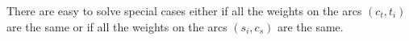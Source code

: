 \documentclass[10pt, conference, letterpaper]{IEEEtran}
\newcommand\pall{\textsc{pall}\xspace}
\begin{document}
%     
%     

There are easy to solve special cases either if all the weights on the arcs $(c_t,t_i)$ are the same or if all the weights on the arcs $(s_i,c_s)$ are the same.
%    
%     
%     
%	 
\end{document}
